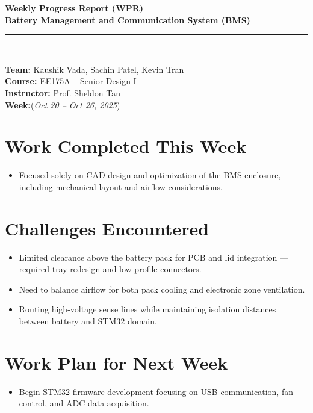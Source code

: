 \documentclass[12pt]{article}
\begin{document}
\begin{center}
    {\Large \textbf{Weekly Progress Report (WPR)}} \\[6pt]
    {\large \textbf{Battery Management and Communication System (BMS)}} \\[2pt]
    \rule{0.8\textwidth}{0.5pt} \\[6pt]
\end{center}

\noindent
\textbf{Team:} Kaushik Vada, Sachin Patel, Kevin Tran \\[3pt]
\textbf{Course:} EE175A – Senior Design I \\
\textbf{Instructor:} Prof. Sheldon Tan \\
\textbf{Week:}(\textit{Oct 20 – Oct 26, 2025}) \\[8pt]

\vspace{1em}

\section{Work Completed This Week}

\begin{itemize}[leftmargin=1cm]
    \item Focused solely on CAD design and optimization of the BMS enclosure, including mechanical layout and airflow considerations.
\end{itemize}

\vspace{1em}

\section{Challenges Encountered}
\begin{itemize}[leftmargin=1cm]
    \item Limited clearance above the battery pack for PCB and lid integration — required tray redesign and low-profile connectors.
    \item Need to balance airflow for both pack cooling and electronic zone ventilation.
    \item Routing high-voltage sense lines while maintaining isolation distances between battery and STM32 domain.
\end{itemize}

\vspace{1em}

\section{Work Plan for Next Week}
\begin{itemize}[leftmargin=1cm]
    \item Begin STM32 firmware development focusing on USB communication, fan control, and ADC data acquisition.
\end{itemize}
\end{document}
